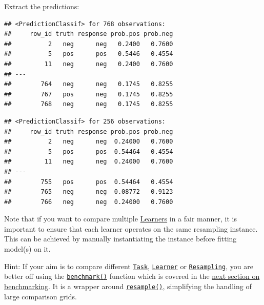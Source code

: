 \documentclass[]{article}
\newenvironment{Shaded}{\begin{snugshade}}{\end{snugshade}}
\newcommand{\CommentTok}[1]{\textcolor[rgb]{0.56,0.35,0.01}{\textit{#1}}}
\newcommand{\DecValTok}[1]{\textcolor[rgb]{0.00,0.00,0.81}{#1}}
\newcommand{\KeywordTok}[1]{\textcolor[rgb]{0.13,0.29,0.53}{\textbf{#1}}}
\newcommand{\NormalTok}[1]{#1}
\newcommand{\OperatorTok}[1]{\textcolor[rgb]{0.81,0.36,0.00}{\textbf{#1}}}
\renewenvironment{Shaded} {\begin{snugshade}\small} {\end{snugshade}}
\begin{document}
Extract the predictions:

\begin{Shaded}
\end{Shaded}

\begin{verbatim}
## <PredictionClassif> for 768 observations:
##     row_id truth response prob.pos prob.neg
##          2   neg      neg   0.2400   0.7600
##          5   pos      pos   0.5446   0.4554
##         11   neg      neg   0.2400   0.7600
## ---                                        
##        764   neg      neg   0.1745   0.8255
##        767   pos      neg   0.1745   0.8255
##        768   neg      neg   0.1745   0.8255
\end{verbatim}

\begin{Shaded}
\end{Shaded}

\begin{verbatim}
## <PredictionClassif> for 256 observations:
##     row_id truth response prob.pos prob.neg
##          2   neg      neg  0.24000   0.7600
##          5   pos      pos  0.54464   0.4554
##         11   neg      neg  0.24000   0.7600
## ---                                        
##        755   pos      pos  0.54464   0.4554
##        765   neg      neg  0.08772   0.9123
##        766   neg      neg  0.24000   0.7600
\end{verbatim}

Note that if you want to compare multiple \protect\hyperlink{learners}{Learners} in a fair manner, it is important to ensure that each learner operates on the same resampling instance.
This can be achieved by manually instantiating the instance before fitting model(s) on it.

Hint: If your aim is to compare different \href{https://mlr3.mlr-org.com/reference/Task.html}{\texttt{Task}}, \href{https://mlr3.mlr-org.com/reference/Learner.html}{\texttt{Learner}} or \href{https://mlr3.mlr-org.com/reference/Resampling.html}{\texttt{Resampling}}, you are better off using the \href{https://mlr3.mlr-org.com/reference/benchmark.html}{\texttt{benchmark()}} function which is covered in the \protect\hyperlink{benchmarking}{next section on benchmarking}.
It is a wrapper around \href{https://mlr3.mlr-org.com/reference/resample.html}{\texttt{resample()}}, simplifying the handling of large comparison grids.
\end{document}
